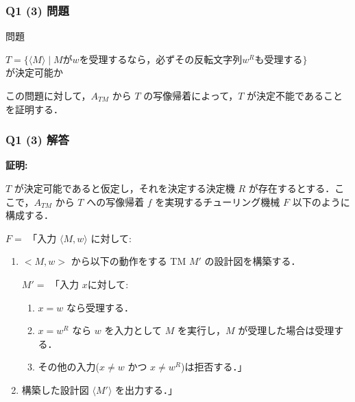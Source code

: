\begin{frame}[fragile]
\frametitle{Q1 (3) 問題}

\begin{alertblock}{問題}

$T = \{\langle M \rangle \mid M \text{が} w \text{を受理するなら，必ずその反転文字列} w^R \text{も受理する}\}$ \\
が決定可能か

\end{alertblock}

この問題に対して，$A_{TM}$ から $T$ の写像帰着によって，$T$ が決定不能であることを証明する．

\end{frame}



\begin{frame}[fragile]
\frametitle{Q1 (3) 解答}

\textbf{証明:}

$T$ が決定可能であると仮定し，それを決定する決定機 $R$ が存在するとする．ここで，$A_{TM}$ から $T$ への写像帰着 $f$ を実現するチューリング機械 $F$ 以下のように構成する．

$F =$ 「入力 $\langle M, w \rangle$ に対して:

\begin{enumerate}
    \item $<M, w>$ から以下の動作をする TM $M'$ の設計図を構築する．

     $M' =$ 「入力 $x$に対して:

    \begin{enumerate}
        \item[1.] $x = w$ なら受理する．
        \item[2.] $x = w^R$ なら $w$ を入力として $M$ を実行し，$M$ が受理した場合は受理する．
        \item[3.] その他の入力($x \neq w$ かつ $x \neq w^R$)は拒否する．」
    \end{enumerate}

    \item 構築した設計図 $\langle M' \rangle$ を出力する．」

\end{enumerate}

\end{frame}



